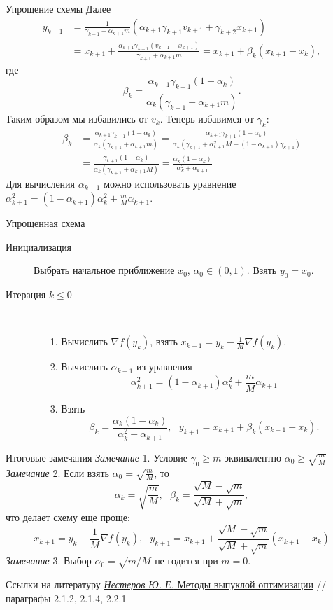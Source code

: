 \documentclass[10pt, handout]{beamer}
\begin{document}
\begin{frame}{Упрощение схемы}
Далее
\begin{align*}
y_{k+1}&=\frac{1}{\gamma_{k+1}+\alpha_{k+1}m}(\alpha_{k+1}\gamma_{k+1}v_{k+1}+\gamma_{k+2}x_{k+1})\\
&=x_{k+1}+\frac{\alpha_{k+1}\gamma_{k+1}(v_{k+1}-x_{k+1})}{\gamma_{k+1}+\alpha_{k+1}m}=x_{k+1}+\beta_k(x_{k+1}-x_k),
\end{align*}
где
$$
\beta_k=\frac{\alpha_{k+1}\gamma_{k+1}(1-\alpha_k)}{\alpha_k(\gamma_{k+1}+\alpha_{k+1}m)}.
$$
\pause
\vspace{1em}
Таким образом мы избавились от $v_k$. Теперь избавимся от $\gamma_k$:
\begin{align*}
\beta_k&=\frac{\alpha_{k+1}\gamma_{k+1}(1-\alpha_k)}{\alpha_k(\gamma_{k+1}+\alpha_{k+1}m)}=\frac{\alpha_{k+1}\gamma_{k+1}(1-\alpha_k)}{\alpha_k(\gamma_{k+1}+\alpha_{k+1}^2M-(1-\alpha_{k+1})\gamma_{k+1})}\\
&=\frac{\gamma_{k+1}(1-\alpha_k)}{\alpha_k(\gamma_{k+1}+\alpha_{k+1}M)}=\frac{\alpha_k(1-\alpha_k)}{\alpha_k^2+\alpha_{k+1}}
\end{align*}
Для вычисления $\alpha_{k+1}$ можно использовать уравнение $\alpha_{k+1}^2=(1-\alpha_{k+1})\alpha_k^2+\frac{m}{M}\alpha_{k+1}$.

\end{frame}

\begin{frame}{Упрощенная схема}
\begin{description}
\item[Инициализация] Выбрать начальное приближение $x_0$, $\alpha_0\in(0,1)$. Взять $y_0=x_0$.
\item[Итерация $k\leq 0$] ~\\
\begin{itemize}
\item[1.] Вычислить $\nabla f(y_k)$, взять $x_{k+1}=y_k-\frac{1}{M}\nabla f(y_k)$.
\item[2.] Вычислить $\alpha_{k+1}$ из уравнения $$\alpha_{k+1}^2=(1-\alpha_{k+1})\alpha_k^2+\frac{m}{M}\alpha_{k+1}$$
\item[3.] Взять
$$
\beta_k=\frac{\alpha_k(1-\alpha_k)}{\alpha_k^2+\alpha_{k+1}},~~~y_{k+1}=x_{k+1}+\beta_k(x_{k+1}-x_k).
$$
\end{itemize}	
\end{description}
\end{frame}

\begin{frame}{Итоговые замечания}
\textit{Замечание} 1. Условие $\gamma_0\geq m$ эквивалентно $\alpha_0\geq \sqrt{\frac{m}{M}}$\\
\vspace{1em}
\pause
\textit{Замечание} 2. Если взять $\alpha_0=\sqrt{\frac{m}{M}}$, то 
$$
\alpha_k=\sqrt{\frac{m}{M}},~~~\beta_k=\frac{\sqrt{M}-\sqrt{m}}{\sqrt{M}+\sqrt{m}},
$$
что делает схему еще проще:
$$
x_{k+1}=y_k-\frac{1}{M}\nabla f(y_k),~~~y_{k+1}=x_{k+1}+\frac{\sqrt{M}-\sqrt{m}}{\sqrt{M}+\sqrt{m}}(x_{k+1}-x_k)
$$
\vspace{1em}
\pause
\textit{Замечание} 3. Выбор $\alpha_0=\sqrt{m/M}$ не годится при $m=0$.
\end{frame}


\begin{frame}{Ссылки на литературу}
\href{http://premolab.ru/pub_files/pub5/MnexoB89z7.pdf}{\textit{Нестеров Ю. Е.} Методы выпуклой оптимизации}
 // параграфы 2.1.2, 2.1.4, 2.2.1


\end{frame}
\end{document}
